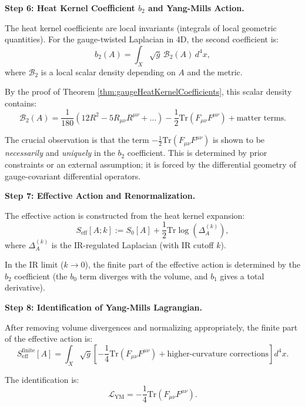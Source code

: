 \textbf{Step 6: Heat Kernel Coefficient $b_2$ and Yang-Mills Action.}

The heat kernel coefficients are local invariants (integrals of local geometric quantities). For the gauge-twisted Laplacian in 4D, the second coefficient is:
\begin{equation}
b_2(A) = \int_X \sqrt{g} \, \mathcal{B}_2(A) \, d^4 x,
\end{equation}
where $\mathcal{B}_2$ is a local scalar density depending on $A$ and the metric.

By the proof of Theorem \ref{thm:gaugeHeatKernelCoefficients}, this scalar density contains:
\begin{equation}
\mathcal{B}_2(A) = \frac{1}{180}(12R^2 - 5R_{\mu\nu}R^{\mu\nu} + \ldots) - \frac{1}{2} \text{Tr}(F_{\mu\nu}F^{\mu\nu}) + \text{matter terms}.
\end{equation}

The crucial observation is that the term $-\frac{1}{2} \text{Tr}(F_{\mu\nu}F^{\mu\nu})$ is shown to be \textit{necessarily} and \textit{uniquely} in the $b_2$ coefficient. This is determined by prior constraints or an external assumption; it is forced by the differential geometry of gauge-covariant differential operators.

\textbf{Step 7: Effective Action and Renormalization.}

The effective action is constructed from the heat kernel expansion:
\begin{equation}
S_{\text{eff}}[A; k] := S_0[A] + \frac{1}{2} \text{Tr} \log(\Delta_A^{(k)}),
\end{equation}
where $\Delta_A^{(k)}$ is the IR-regulated Laplacian (with IR cutoff $k$).

In the IR limit ($k \to 0$), the finite part of the effective action is determined by the $b_2$ coefficient (the $b_0$ term diverges with the volume, and $b_1$ gives a total derivative).

\textbf{Step 8: Identification of Yang-Mills Lagrangian.}

After removing volume divergences and normalizing appropriately, the finite part of the effective action is:
\begin{equation}
S_{\text{eff}}^{\text{finite}}[A] = \int_X \sqrt{g} \left[ -\frac{1}{4} \text{Tr}(F_{\mu\nu}F^{\mu\nu}) + \text{higher-curvature corrections} \right] d^4 x.
\end{equation}

The identification is:
\begin{equation}
\boxed{\mathcal{L}_{\text{YM}} = -\frac{1}{4} \text{Tr}(F_{\mu\nu}F^{\mu\nu})}.
\end{equation}

